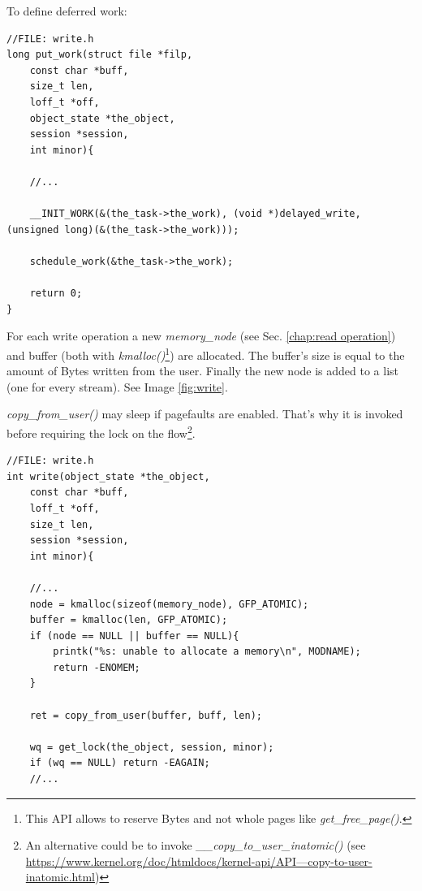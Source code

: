 \documentclass[12pt]{report}
\begin{document}
To define deferred work:

\begin{lstlisting}
//FILE: write.h
long put_work(struct file *filp,
	const char *buff,
	size_t len,
	loff_t *off,
	object_state *the_object,
	session *session,
	int minor){
	
	//...
	
	__INIT_WORK(&(the_task->the_work), (void *)delayed_write, (unsigned long)(&(the_task->the_work)));
	
	schedule_work(&the_task->the_work);
	
	return 0;
}
\end{lstlisting}

For each write operation a new \emph{memory\_node} (see Sec. \ref{chap:read operation}) and buffer (both with \emph{kmalloc()}\footnote{This API allows to reserve Bytes and not whole pages like \emph{get\_free\_page()}.}) are allocated. The buffer's size is equal to the amount of Bytes written from the user. Finally the new node is added to a list (one for every stream). See Image \ref{fig:write}.

\emph{copy\_from\_user()} may sleep if pagefaults are enabled. That's why it is invoked before requiring the lock on the flow\footnote{An alternative could be to invoke \emph{\_\_copy\_to\_user\_inatomic()} (see \href{https://www.kernel.org/doc/htmldocs/kernel-api/API---copy-to-user-inatomic.html}{https://www.kernel.org/doc/htmldocs/kernel-api/API---copy-to-user-inatomic.html})}.

\begin{lstlisting}
//FILE: write.h
int write(object_state *the_object,
	const char *buff,
	loff_t *off, 
	size_t len, 
	session *session,
	int minor){

	//...
	node = kmalloc(sizeof(memory_node), GFP_ATOMIC);
	buffer = kmalloc(len, GFP_ATOMIC);
	if (node == NULL || buffer == NULL){
		printk("%s: unable to allocate a memory\n", MODNAME);
		return -ENOMEM;
	}
	
	ret = copy_from_user(buffer, buff, len);
	
	wq = get_lock(the_object, session, minor);
	if (wq == NULL) return -EAGAIN;
	//...
\end{lstlisting}
\end{document}
